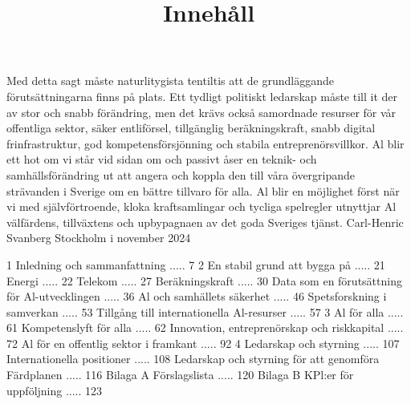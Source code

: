 Med detta sagt måste naturlitygista tentiltis att de grundläggande förutsättningarna finns på plats. Ett tydligt politiskt ledarskap måste till it der av stor och snabb förändring, men det krävs också samordnade resurser för vår offentliga sektor, säker entliförsel, tillgänglig beräkningskraft, snabb digital frinfrastruktur, god kompetensförsjönning och stabila entreprenörsvillkor.
Al blir ett hot om vi står vid sidan om och passivt åser en teknik- och samhällsförändring ut att angera och koppla den till våra övergripande strävanden i Sverige om en bättre tillvaro för alla. Al blir en möjlighet först när vi med självförtroende, kloka kraftsamlingar och tycliga spelregler utnyttjar Al välfärdens, tillväxtens och upbypagnaen av det goda Sveriges tjänst.
Carl-Henric Svanberg
Stockholm i november 2024

\title{
Innehåll
}
1 Inledning och sammanfattning ..... 7
2 En stabil grund att bygga på ..... 21
Energi ..... 22
Telekom ..... 27
Beräkningskraft ..... 30
Data som en förutsättning för Al-utvecklingen ..... 36
Al och samhällets säkerhet ..... 46
Spetsforskning i samverkan ..... 53
Tillgång till internationella Al-resurser ..... 57
3 Al för alla ..... 61
Kompetenslyft för alla ..... 62
Innovation, entreprenörskap och riskkapital ..... 72
Al för en offentlig sektor i framkant ..... 92
4 Ledarskap och styrning ..... 107
Internationella positioner ..... 108
Ledarskap och styrning för att genomföra Färdplanen ..... 116
Bilaga A Förslagslista ..... 120
Bilaga B KPl:er för uppföljning ..... 123


